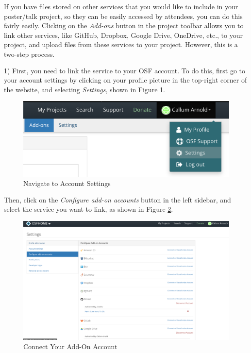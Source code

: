 \documentclass{scrartcl}
\begin{document}
If you have files stored on other services that you would like to include in your poster/talk project, so they can be easily accessed by attendees, you can do this fairly easily.
Clicking on the \emph{Add-ons} button in the project toolbar allows you to link other services, like GitHub, Dropbox, Google Drive, OneDrive, etc., to your project, and upload files from these services to your project.
However, this is a two-step process.

1) First, you need to link the service to your OSF account.
To do this, first go to your account settings by clicking on your profile picture in the top-right corner of the website, and selecting \emph{Settings}, shown in Figure \ref{fig:addons-account-settings-01}.

\begin{figure}[!htb]
    \centering
    \includegraphics[scale=0.5]{addons-account-settings-01.png}
    \caption{Navigate to Account Settings}
    \label{fig:addons-account-settings-01}
\end{figure}

Then, click on the \emph{Configure add-on accounts} button in the left sidebar, and select the service you want to link, as shown in Figure \ref{fig:addons-account-settings-02}.

\begin{figure}[!htb]
    \centering
    \includegraphics[width=\textwidth]{addons-account-settings-02.png}
    \caption{Connect Your Add-On Account}
    \label{fig:addons-account-settings-02}
\end{figure}
\end{document}
